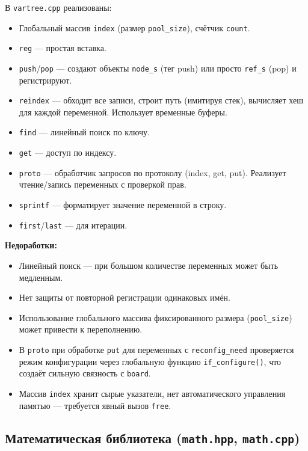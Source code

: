 \documentclass[a4paper,12pt]{article}
\begin{document}
В \texttt{vartree.cpp} реализованы:

\begin{itemize}
    \item Глобальный массив \texttt{index} (размер \texttt{pool\_size}), счётчик \texttt{count}.
    \item \texttt{reg} — простая вставка.
    \item \texttt{push}/\texttt{pop} — создают объекты \texttt{node\_s} (тег push) или просто \texttt{ref\_s} (pop) и регистрируют.
    \item \texttt{reindex} — обходит все записи, строит путь (имитируя стек), вычисляет хеш для каждой переменной. Использует временные буферы.
    \item \texttt{find} — линейный поиск по ключу.
    \item \texttt{get} — доступ по индексу.
    \item \texttt{proto} — обработчик запросов по протоколу (index, get, put). Реализует чтение/запись переменных с проверкой прав.
    \item \texttt{sprintf} — форматирует значение переменной в строку.
    \item \texttt{first}/\texttt{last} — для итерации.
\end{itemize}

\textbf{Недоработки:}
\begin{itemize}
    \item Линейный поиск — при большом количестве переменных может быть медленным.
    \item Нет защиты от повторной регистрации одинаковых имён.
    \item Использование глобального массива фиксированного размера (\texttt{pool\_size}) может привести к переполнению.
    \item В \texttt{proto} при обработке \texttt{put} для переменных с \texttt{reconfig\_need} проверяется режим конфигурации через глобальную функцию \texttt{if\_configure()}, что создаёт сильную связность с \texttt{board}.
    \item Массив \texttt{index} хранит сырые указатели, нет автоматического управления памятью — требуется явный вызов \texttt{free}.
\end{itemize}

\subsection{Математическая библиотека (\texttt{math.hpp}, \texttt{math.cpp})}
\end{document}
